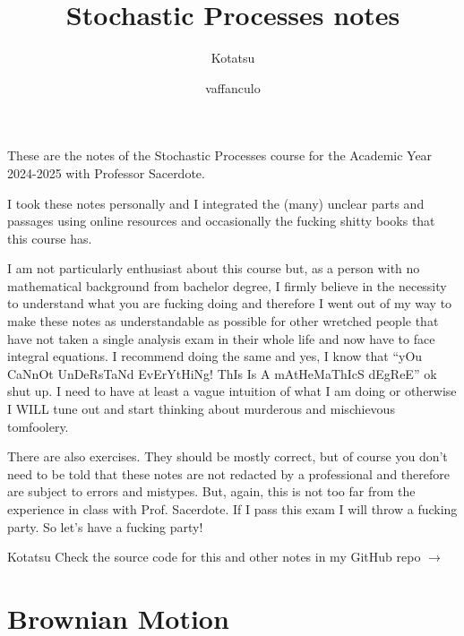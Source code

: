 \documentclass[12pt]{report}
\begin{document}
	\title{Stochastic Processes notes}
	\author{Kotatsu}
	\date{\small vaffanculo}
	\maketitle
	\begin{preface}
		These are the notes of the Stochastic Processes course for the Academic Year 2024-2025 with Professor Sacerdote.\par
		I took these notes personally and I integrated the (many) unclear parts and passages using online resources and occasionally the fucking shitty books that this course has. \par
		I am not particularly enthusiast about this course but, as a person with no mathematical background from bachelor degree, I firmly believe in the necessity to understand what you are fucking doing and therefore I went out of my way to make these notes as understandable as possible for other wretched people that have not taken a single analysis exam in their whole life and now have to face integral equations. I recommend doing the same and yes, I know that ``yOu CaNnOt UnDeRsTaNd EvErYtHiNg! ThIs Is A mAtHeMaThIcS dEgReE'' ok shut up. I need to have at least a vague intuition of what I am doing or otherwise I WILL tune out and start thinking about murderous and mischievous tomfoolery.\par
		There are also exercises. They should be mostly correct, but of course you don't need to be told that these notes are not redacted by a professional and therefore are subject to errors and mistypes. But, again, this is not too far from the experience in class with Prof. Sacerdote. If I pass this exam I will throw a fucking party.
		\vskip0.4cm
So let's have a fucking party!
		
		\vskip1.2cm
		
		\hfill Kotatsu
		\vskip1.2cm
		Check the source code for this and other notes in my GitHub repo $\to$ \href{https://github.com/godblessourdeadkotatsu/lecture-notes-2024-25/tree/main/SP}{\faGithubSquare}
	\end{preface}
	\clearpage
	\tableofcontents
\chapter{Brownian Motion}	
\end{document}
